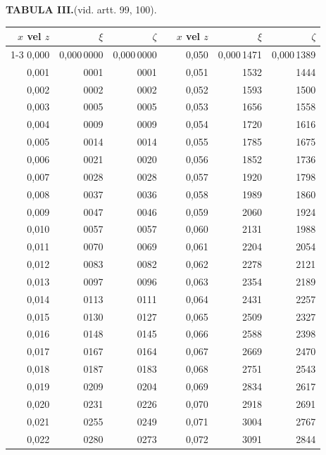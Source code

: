 \clearpage
{}
\begingroup
\centering
\fontsize{9}{9}\selectfont
\setlength{\tabcolsep}{8pt}
\renewcommand{\arraystretch}{1}
\setlength{\parskip}{0pt}
\textbf{TABULA III.}\quad (vid. artt. 99, 100).
\par\vspace{7pt}
\begin{tabular}{|r|r|r|@{}p{9pt}@{}|r|r|r|}
\hline
\(x\) vel \(z\) & \(\xi\) & \(\zeta\) & & \(x\) vel \(z\) & \(\xi\) & \(\zeta\) \\
\cline{1-3}\cline{5-7}
0,000 & 0,000\,0000 & 0,000\,0000 &  & 0,050 & 0,000\,1471 & 0,000\,1389 \\
0,001 & 0001 & 0001 &  & 0,051 & 1532 & 1444 \\
0,002 & 0002 & 0002 &  & 0,052 & 1593 & 1500 \\
0,003 & 0005 & 0005 &  & 0,053 & 1656 & 1558 \\
0,004 & 0009 & 0009 &  & 0,054 & 1720 & 1616 \\
0,005 & 0014 & 0014 &  & 0,055 & 1785 & 1675 \\[3pt]
0,006 & 0021 & 0020 &  & 0,056 & 1852 & 1736 \\
0,007 & 0028 & 0028 &  & 0,057 & 1920 & 1798 \\
0,008 & 0037 & 0036 &  & 0,058 & 1989 & 1860 \\
0,009 & 0047 & 0046 &  & 0,059 & 2060 & 1924 \\
0,010 & 0057 & 0057 &  & 0,060 & 2131 & 1988 \\[3pt]
0,011 & 0070 & 0069 &  & 0,061 & 2204 & 2054 \\
0,012 & 0083 & 0082 &  & 0,062 & 2278 & 2121 \\
0,013 & 0097 & 0096 &  & 0,063 & 2354 & 2189 \\
0,014 & 0113 & 0111 &  & 0,064 & 2431 & 2257 \\
0,015 & 0130 & 0127 &  & 0,065 & 2509 & 2327 \\[3pt]
0,016 & 0148 & 0145 &  & 0,066 & 2588 & 2398 \\
0,017 & 0167 & 0164 &  & 0,067 & 2669 & 2470 \\
0,018 & 0187 & 0183 &  & 0,068 & 2751 & 2543 \\
0,019 & 0209 & 0204 &  & 0,069 & 2834 & 2617 \\
0,020 & 0231 & 0226 &  & 0,070 & 2918 & 2691 \\[3pt]
0,021 & 0255 & 0249 &  & 0,071 & 3004 & 2767 \\
0,022 & 0280 & 0273 &  & 0,072 & 3091 & 2844 \\

\end{tabular}
